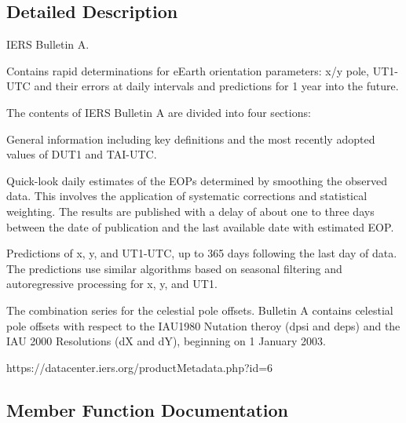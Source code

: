 \subsection{Detailed Description}
I\+E\+RS Bulletin A. 

Contains rapid determinations for e\+Earth orientation parameters\+: x/y pole, U\+T1-\/\+U\+TC and their errors at daily intervals and predictions for 1 year into the future.

The contents of I\+E\+RS Bulletin A are divided into four sections\+:


\begin{DoxyEnumerate}
\item General information including key definitions and the most recently adopted values of D\+U\+T1 and T\+A\+I-\/\+U\+TC.
\item Quick-\/look daily estimates of the E\+O\+Ps determined by smoothing the observed data. This involves the application of systematic corrections and statistical weighting. The results are published with a delay of about one to three days between the date of publication and the last available date with estimated E\+OP.
\item Predictions of x, y, and U\+T1-\/\+U\+TC, up to 365 days following the last day of data. The predictions use similar algorithms based on seasonal filtering and autoregressive processing for x, y, and U\+T1.
\item The combination series for the celestial pole offsets. Bulletin A contains celestial pole offsets with respect to the I\+A\+U1980 Nutation theroy (dpsi and deps) and the I\+AU 2000 Resolutions (dX and dY), beginning on 1 January 2003.
\end{DoxyEnumerate}

https\+://datacenter.iers.\+org/product\+Metadata.php?id=6 

\subsection{Member Function Documentation}
\mbox{\label{classlibrary_1_1physics_1_1coord_1_1frame_1_1provider_1_1iers_1_1_bulletin_a_aa11bd395146f5fba123269de30353bcc}} 
